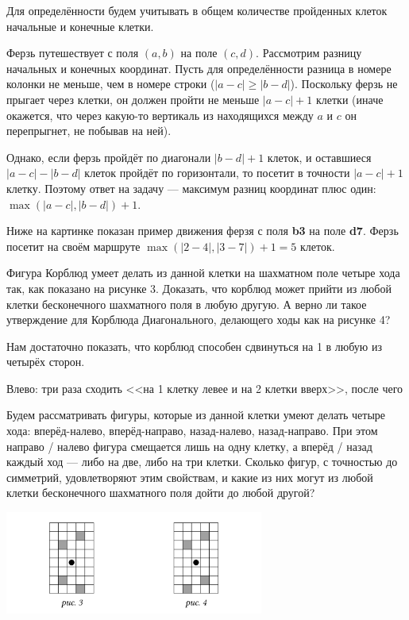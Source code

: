 \begin{itemize}
\itA Для определённости будем учитывать в общем количестве пройденных клеток начальные и конечные клетки.

Ферзь путешествует с поля $(a,b)$ на поле $(c,d)$. Рассмотрим разницу начальных и конечных координат. 
Пусть для определённости разница в номере колонки не меньше, чем в номере строки ($|a-c| \ge |b-d|$).
Поскольку ферзь не прыгает через клетки, он должен пройти не меньше $|a-c|+1$ клетки (иначе окажется,
что через какую-то вертикаль из находящихся между $a$ и $c$ он перепрыгнет, не побывав на ней).

Однако, если ферзь пройдёт по диагонали $|b-d|+1$ клеток, и оставшиеся $|a-c|-|b-d|$ клеток пройдёт
по горизонтали, то посетит в точности $|a-c|+1$ клетку. 
Поэтому ответ на задачу --- максимум разниц координат плюс один: $\max(|a-c|,|b-d|)+1$.

Ниже на картинке показан пример движения ферзя с поля {\bfseries b3} на поле {\bfseries d7}. 
Ферзь посетит на своём маршруте $\max(|2-4|,|3-7|)+1 = 5$ клеток.

\begin{center}\end{center}

\itB Фигура Корблюд умеет делать из данной клетки на шахматном поле четыре хода так, как показано на 
рисунке 3. Доказать, что корблюд может прийти из любой клетки бесконечного шахматного поля в любую 
другую. А верно ли такое утверждение для Корблюда Диагонального, делающего ходы как на рисунке 4?

Нам достаточно показать, что корблюд способен сдвинуться на 1 в любую из четырёх сторон.

Влево: три раза сходить <<на 1 клетку левее и на 2 клетки вверх>>, после чего 

\itC Будем рассматривать фигуры, которые из данной клетки умеют делать четыре хода: 
вперёд-налево, вперёд-направо, назад-налево, назад-направо. При этом направо / налево фигура 
смещается лишь на одну клетку, а вперёд / назад каждый ход — либо на две, либо на три клетки. 
Сколько фигур, с точностью до симметрий, удовлетворяют этим свойствам, и какие из них могут 
из любой клетки бесконечного шахматного поля дойти до любой другой?
\end{itemize}

\begin{center}
  \includegraphics[width=8.5cm]{figures/2016/corbleud.png}
\end{center}
